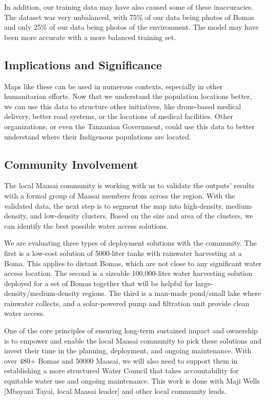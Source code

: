 \documentclass[10pt]{article}
\begin{document}
In addition, our training data may have also caused some of these inaccuracies. The dataset was very unbalanced, with 75\% of our data being photos of Bomas and only 25\% of our data being photos of the environment. The model may have been more accurate with a more balanced training set.

\subsection{Implications and Significance}

Maps like these can be used in numerous contexts, especially in other humanitarian efforts. Now that we understand the population locations better, we can use this data to structure other initiatives, like drone-based medical delivery, better road systems, or the locations of medical facilities. Other organizations, or even the Tanzanian Government, could use this data to better understand where their Indigenous populations are located.

\subsection{Community Involvement}

The local Maasai community is working with us to validate the outputs' results with a formal group of Maasai members from across the region. With the validated data, the next step is to segment the map into high-density, medium-density, and low-density clusters. Based on the size and area of the clusters, we can identify the best possible water access solutions.

We are evaluating three types of deployment solutions with the community. The first is a low-cost solution of 5000-liter tanks with rainwater harvesting at a Boma. This applies to distant Bomas, which are not close to any significant water access location. The second is a sizeable 100,000-liter water harvesting solution deployed for a set of Bomas together that will be helpful for large-density/medium-density regions. The third is a man-made pond/small lake where rainwater collects, and a solar-powered pump and filtration unit provide clean water access.

One of the core principles of ensuring long-term sustained impact and ownership is to empower and enable the local Maasai community to pick these solutions and invest their time in the planning, deployment, and ongoing maintenance. With over 480+ Bomas and 50000 Maasai, we will also need to support them in establishing a more structured Water Council that takes accountability for equitable water use and ongoing maintenance. This work is done with Maji Wells [Mbayani Tayai, local Maasai leader] and other local community leads.
\end{document}
